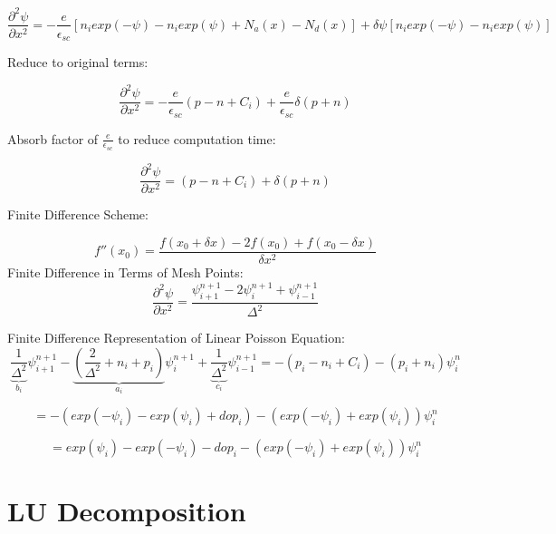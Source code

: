 \documentclass[12pt]{article}
\begin{document}
\begin{equation}
\frac{\partial^{2} \psi}{\partial x^{2}} =
-\frac{e}{\epsilon_{sc}}
[n_{i}exp(-\psi)-n_{i}exp(\psi)+N_{a}(x)-N_{d}(x)]+
\delta \psi [n_{i}exp(-\psi)-n_{i}exp(\psi)]
\end{equation}

Reduce to original terms:

\begin{equation}
\frac{\partial^{2} \psi}{\partial x^{2}}
=
-\frac{e}{\epsilon_{sc}}
(p-n+C_{i})+\frac{e}{\epsilon_{sc}}\delta(p+n)
\end{equation}

Absorb factor of $ \frac{e}{\epsilon_{sc}} $ to reduce computation time:

\begin{equation}
\frac{\partial^{2} \psi}{\partial x^{2}}
=
(p-n+C_{i})+\delta(p+n)
\end{equation}


Finite Difference Scheme:

\begin{equation}
f''(x_{0})=\frac{f(x_{0}+\delta x)-2f(x_{0})+f(x_{0}-\delta x)}{\delta x^{2}}
\end{equation}
Finite Difference in Terms of Mesh Points:
\begin{equation}
\frac{\partial^{2} \psi}{\partial x^{2}}
=
\frac{
\psi^{n+1}_{i+1}-
2\psi^{n+1}_{i}+
\psi^{n+1}_{i-1}
}{\Delta^{2}}
\end{equation}


Finite Difference Representation of Linear Poisson Equation:
\begin{equation}
	\underbrace{\frac{1}{\Delta^{2}}}_{b_{i}}\psi^{n+1}_{i+1}
	-\underbrace{(\frac{2}{\Delta^{2}}+n_{i}+p_{i})}_{a_{i}}\psi^{n+1}_{i}
	+\underbrace{\frac{1}{\Delta^{2}}}_{c_{i}}\psi^{n+1}_{i-1}=
	-(p_{i}-n_{i}+C_{i})-(p_{i}+n_{i})\psi^{n}_{i}
\end{equation}

\begin{equation}
	=-(exp(-\psi_{i})-exp(\psi_{i})+dop_{i})-(exp(-\psi_{i})+exp(\psi_{i}))\psi^{n}_{i}
\end{equation}

\begin{equation}
	=exp(\psi_{i})-exp(-\psi_{i})-dop_{i}-(exp(-\psi_{i})+exp(\psi_{i}))\psi^{n}_{i}
\end{equation}

\section{LU Decomposition}
\end{document}
